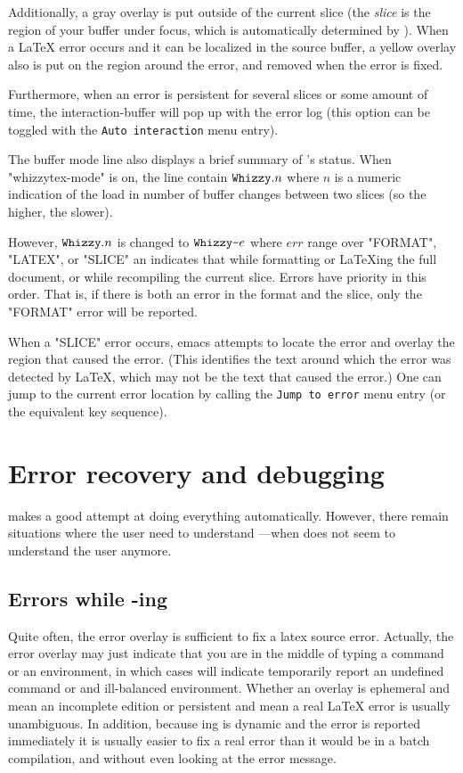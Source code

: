 \documentclass[12pt]{article}
\begin{document}
Additionally, a gray overlay is put outside of the current slice (the {\em
slice} is the region of your buffer under focus, which is automatically
determined by {\whizzy}). When a {\LaTeX} error occurs and it can be
localized in the source buffer, a yellow overlay also is put on the region
around the error, and removed when the error is fixed.

Furthermore, when an error is persistent for several slices or some amount
of time, the interaction-buffer will pop up with the error log
(this option can be toggled with the {\tt Auto interaction} menu entry).

The buffer mode line also displays a brief summary of
{\whizzy}'s status.  When \lst"whizzytex-mode" is on, the line contain
$\lst"Whizzy".n$ where $n$ is a numeric indication of the load in number
of buffer changes between two slices (so the higher, the slower).

However, $\lst"Whizzy".n$ is changed to $\lst"Whizzy-"e$ where $err$ range
over \lst"FORMAT", \lst"LATEX", or \lst"SLICE" an indicates that while
formatting or \LaTeX ing the full document, or while recompiling the current
slice. Errors have priority in this order.  That is, if there is both an
error in the format and the slice, only the \lst"FORMAT" error will be
reported.

When a \lst"SLICE" error occurs, emacs attempts to locate the error
and overlay the region that caused the error. (This identifies the
text around which  the error was detected by \LaTeX, which may not be the
text that caused the error.) One can jump to the current error location by
calling the \texttt {Jump to error} menu entry (or the equivalent key
sequence).


\section{Error recovery and debugging}

{\whizzy} makes a good attempt at doing everything automatically.
However, there remain situations where the user need to understand
{\whizzy} ---when {\whizzy} does not seem to understand the user anymore.

\subsection {Errors while \whizzy-ing}

Quite often, the error overlay is sufficient to fix a latex source error.
Actually, the error overlay may just indicate that you are in the middle of
typing a command or an environment, in which cases {\whizzy} will indicate
temporarily report an undefined command or and ill-balanced environment.
Whether an overlay is ephemeral and mean an incomplete edition or
persistent and mean a real {\LaTeX} error is usually unambiguous.
In addition, because \whizzy ing is dynamic and the error is reported
immediately it is usually easier to fix a real error than it would be in a
batch compilation, and without even looking at the error message.
\end{document}
